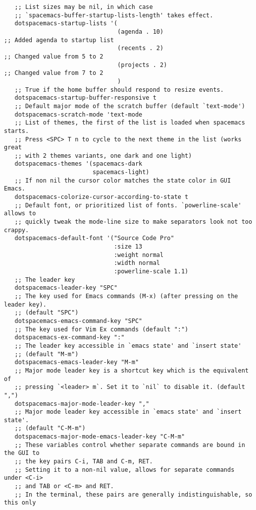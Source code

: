 \documentclass[11pt]{article}
\begin{document}
\begin{verbatim}
   ;; List sizes may be nil, in which case
   ;; `spacemacs-buffer-startup-lists-length' takes effect.
   dotspacemacs-startup-lists '(
                                (agenda . 10)                                                    ;; Added agenda to startup list
                                (recents . 2)                                                    ;; Changed value from 5 to 2
                                (projects . 2)                                                   ;; Changed value from 7 to 2
                                )
   ;; True if the home buffer should respond to resize events.
   dotspacemacs-startup-buffer-responsive t
   ;; Default major mode of the scratch buffer (default `text-mode')
   dotspacemacs-scratch-mode 'text-mode
   ;; List of themes, the first of the list is loaded when spacemacs starts.
   ;; Press <SPC> T n to cycle to the next theme in the list (works great
   ;; with 2 themes variants, one dark and one light)
   dotspacemacs-themes '(spacemacs-dark
                         spacemacs-light)
   ;; If non nil the cursor color matches the state color in GUI Emacs.
   dotspacemacs-colorize-cursor-according-to-state t
   ;; Default font, or prioritized list of fonts. `powerline-scale' allows to
   ;; quickly tweak the mode-line size to make separators look not too crappy.
   dotspacemacs-default-font '("Source Code Pro"
                               :size 13
                               :weight normal
                               :width normal
                               :powerline-scale 1.1)
   ;; The leader key
   dotspacemacs-leader-key "SPC"
   ;; The key used for Emacs commands (M-x) (after pressing on the leader key).
   ;; (default "SPC")
   dotspacemacs-emacs-command-key "SPC"
   ;; The key used for Vim Ex commands (default ":")
   dotspacemacs-ex-command-key ":"
   ;; The leader key accessible in `emacs state' and `insert state'
   ;; (default "M-m")
   dotspacemacs-emacs-leader-key "M-m"
   ;; Major mode leader key is a shortcut key which is the equivalent of
   ;; pressing `<leader> m`. Set it to `nil` to disable it. (default ",")
   dotspacemacs-major-mode-leader-key ","
   ;; Major mode leader key accessible in `emacs state' and `insert state'.
   ;; (default "C-M-m")
   dotspacemacs-major-mode-emacs-leader-key "C-M-m"
   ;; These variables control whether separate commands are bound in the GUI to
   ;; the key pairs C-i, TAB and C-m, RET.
   ;; Setting it to a non-nil value, allows for separate commands under <C-i>
   ;; and TAB or <C-m> and RET.
   ;; In the terminal, these pairs are generally indistinguishable, so this only

\end{verbatim}
\end{document}
